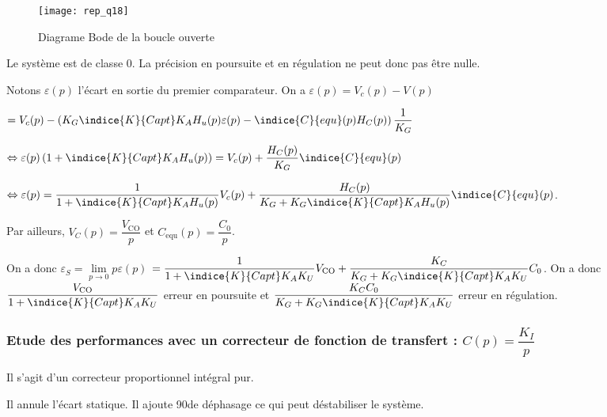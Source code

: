 \begin{figure}[H]
\centering
\texttt{[image: rep\_q18]}
\caption{Diagrame Bode de la boucle ouverte \label{rep_q_18}}
\end{figure}

\fi


\ifprof
\begin{corrige}
Le système est de classe 0. La précision en poursuite et en régulation ne peut donc pas être nulle.

Notons $\varepsilon(p)$ l'écart en sortie du premier comparateur. On a  
$\varepsilon(p) = V_c(p)-V(p)$

$=V_c(p)-\left(K_G\indice{K}{Capt}K_A H_u(p) \varepsilon(p)- \indice{C}{equ}(p)H_C(p) \right)\dfrac{1}{K_G}$ 

$\Leftrightarrow \varepsilon(p)\left( 1+ \indice{K}{Capt}K_A H_u(p)\right)=V_c(p)+  \dfrac{H_C(p)}{K_G}\indice{C}{equ}(p)$

$\Leftrightarrow \varepsilon(p)=\dfrac{1}{1+ \indice{K}{Capt}K_A H_u(p)}V_c(p)+ \dfrac{H_C(p)}{K_G+ K_G\indice{K}{Capt}K_A H_u(p)}\indice{C}{equ}(p)$.

Par ailleurs, $V_C (p)=\dfrac{V_{\text{CO}}}{p}$ et $C_{\text{equ}} (p) = \dfrac{C_0}{p}$.

On a donc $\varepsilon_S = \lim\limits_{p\to 0} p \varepsilon(p)$
$=\dfrac{1}{1+ \indice{K}{Capt}K_A K_U}V_{\text{CO}}+ \dfrac{K_C}{K_G+ K_G\indice{K}{Capt}K_A K_U}C_0$.
On a donc $\dfrac{V_{\text{CO}}}{1+ \indice{K}{Capt}K_A K_U}$ erreur en poursuite et 
$\dfrac{K_C C_0}{K_G+ K_G\indice{K}{Capt}K_A K_U}$ erreur en régulation.
\end{corrige}
\else
\fi


\subsubsection{Etude des performances avec un correcteur de fonction de transfert : $C(p)=\dfrac{K_I}{p}$}

\ifprof
\begin{corrige}
Il s'agit d'un correcteur proportionnel intégral pur. 

Il annule l'écart statique. Il ajoute 90\degres de déphasage ce qui peut déstabiliser le système.
\end{corrige}
\else
\fi


